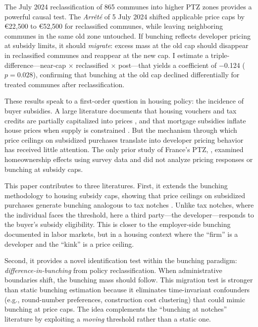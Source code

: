 \documentclass[12pt]{article}
\begin{document}
The July 2024 reclassification of 865 communes into higher PTZ zones provides a powerful causal test. The \textit{Arr\^{e}t\'{e}} of 5 July 2024 shifted applicable price caps by \euro22,500 to \euro52,500 for reclassified communes, while leaving neighboring communes in the same old zone untouched. If bunching reflects developer pricing at subsidy limits, it should \textit{migrate}: excess mass at the old cap should disappear in reclassified communes and reappear at the new cap. I estimate a triple-difference---near-cap $\times$ reclassified $\times$ post---that yields a coefficient of $-$0.124 ($p = 0.028$), confirming that bunching at the old cap declined differentially for treated communes after reclassification.

These results speak to a first-order question in housing policy: the incidence of buyer subsidies. A large literature documents that housing vouchers and tax credits are partially capitalized into prices \citep{susin2002rent, fack2006capital, eriksen2015subsidy}, and that mortgage subsidies inflate house prices when supply is constrained \citep{glaeser2008housing, mian2009consequences}. But the mechanism through which price ceilings on subsidized purchases translate into developer pricing behavior has received little attention. The only prior study of France's PTZ, \citet{gobillon2008impact}, examined homeownership effects using survey data and did not analyze pricing responses or bunching at subsidy caps.

This paper contributes to three literatures. First, it extends the bunching methodology \citep{saez2010taxpayers, chetty2011adjustment, kleven2016bunching} to housing subsidy caps, showing that price ceilings on subsidized purchases generate bunching analogous to tax notches \citep{kleven2013using, slemrod2013notch}. Unlike tax notches, where the individual faces the threshold, here a third party---the developer---responds to the buyer's subsidy eligibility. This is closer to the employer-side bunching documented in labor markets, but in a housing context where the ``firm'' is a developer and the ``kink'' is a price ceiling.

Second, it provides a novel identification test within the bunching paradigm: \textit{difference-in-bunching} from policy reclassification. When administrative boundaries shift, the bunching mass should follow. This migration test is stronger than static bunching estimation because it eliminates time-invariant confounders (e.g., round-number preferences, construction cost clustering) that could mimic bunching at price caps. The idea complements the ``bunching at notches'' literature \citep{best2018housing, kopczuk2016notch} by exploiting a \textit{moving} threshold rather than a static one.
\end{document}
